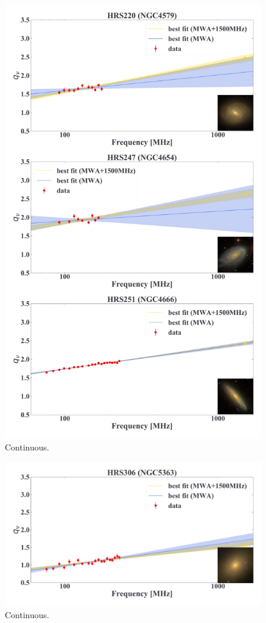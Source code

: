 \documentclass[12pt,a4paper,twoside,openright,final,titlepage]{report}
\begin{document}
\begin{appendices}
\begin{figure}[htbp]
    \centering
    \includegraphics[width=.8\linewidth]{Figures/AppendixC_qfitting6.pdf}
    \caption[Fitting results for 18 samples (6)]{\label{fig:fittingresults6}
        Continuous.
    }
\end{figure}

\begin{figure}[htbp]
    \centering
    \includegraphics[width=.8\linewidth]{Figures/AppendixC_qfitting7.pdf}
    \caption[Fitting results for 18 samples (7)]{\label{fig:fittingresults7}
        Continuous.
    }
\end{figure}

\end{appendices}
\end{document}
